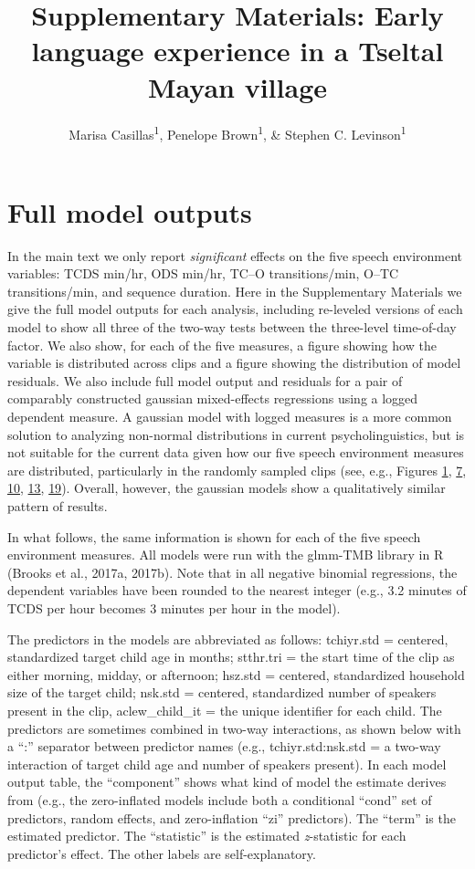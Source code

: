 \documentclass[floatsintext,man]{apa6}
\title{Supplementary Materials: Early language experience in a Tseltal Mayan
village}
\author{Marisa Casillas\textsuperscript{1}, Penelope Brown\textsuperscript{1}, \& Stephen C. Levinson\textsuperscript{1}}
\affiliation{
    \vspace{0.5cm}
          \textsuperscript{1} Max Planck Institute for Psycholinguistics  }
\theoremstyle{definition}
\theoremstyle{definition}
\theoremstyle{definition}
\theoremstyle{remark}
\begin{document}
\maketitle

\setcounter{secnumdepth}{0}



\section{Full model outputs}\label{models}

In the main text we only report \emph{significant} effects on the five
speech environment variables: TCDS min/hr, ODS min/hr, TC--O
transitions/min, O--TC transitions/min, and sequence duration. Here in
the Supplementary Materials we give the full model outputs for each
analysis, including re-leveled versions of each model to show all three
of the two-way tests between the three-level time-of-day factor. We also
show, for each of the five measures, a figure showing how the variable
is distributed across clips and a figure showing the distribution of
model residuals. We also include full model output and residuals for a
pair of comparably constructed gaussian mixed-effects regressions using
a logged dependent measure. A gaussian model with logged measures is a
more common solution to analyzing non-normal distributions in current
psycholinguistics, but is not suitable for the current data given how
our five speech environment measures are distributed, particularly in
the randomly sampled clips (see, e.g., Figures
\protect\hyperlink{fig1}{1}, \protect\hyperlink{fig7}{7},
\protect\hyperlink{fig10}{10}, \protect\hyperlink{fig13}{13},
\protect\hyperlink{fig19}{19}). Overall, however, the gaussian models
show a qualitatively similar pattern of results.

In what follows, the same information is shown for each of the five
speech environment measures. All models were run with the glmm-TMB
library in R (Brooks et al., 2017a, 2017b). Note that in all negative
binomial regressions, the dependent variables have been rounded to the
nearest integer (e.g., 3.2 minutes of TCDS per hour becomes 3 minutes
per hour in the model).

The predictors in the models are abbreviated as follows: tchiyr.std =
centered, standardized target child age in months; stthr.tri = the start
time of the clip as either morning, midday, or afternoon; hsz.std =
centered, standardized household size of the target child; nsk.std =
centered, standardized number of speakers present in the clip,
aclew\_child\_it = the unique identifier for each child. The predictors
are sometimes combined in two-way interactions, as shown below with a
\enquote{:} separator between predictor names (e.g., tchiyr.std:nsk.std
= a two-way interaction of target child age and number of speakers
present). In each model output table, the \enquote{component} shows what
kind of model the estimate derives from (e.g., the zero-inflated models
include both a conditional \enquote{cond} set of predictors, random
effects, and zero-inflation \enquote{zi} predictors). The \enquote{term}
is the estimated predictor. The \enquote{statistic} is the estimated
\emph{z}-statistic for each predictor's effect. The other labels are
self-explanatory.
\end{document}
